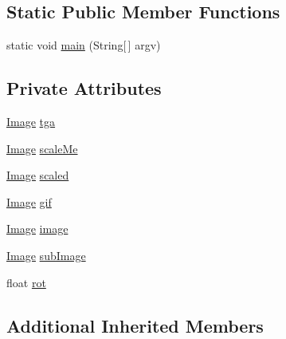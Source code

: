\subsection*{Static Public Member Functions}
\begin{DoxyCompactItemize}
\item 
static void \mbox{\hyperlink{classorg_1_1newdawn_1_1slick_1_1tests_1_1_canvas_container_test_aaadfc68daa8826aaedb71d829018bfdb}{main}} (String\mbox{[}$\,$\mbox{]} argv)
\end{DoxyCompactItemize}
\subsection*{Private Attributes}
\begin{DoxyCompactItemize}
\item 
\mbox{\hyperlink{classorg_1_1newdawn_1_1slick_1_1_image}{Image}} \mbox{\hyperlink{classorg_1_1newdawn_1_1slick_1_1tests_1_1_canvas_container_test_ae2f4c29119e720e355fa9c7f48ded3f8}{tga}}
\item 
\mbox{\hyperlink{classorg_1_1newdawn_1_1slick_1_1_image}{Image}} \mbox{\hyperlink{classorg_1_1newdawn_1_1slick_1_1tests_1_1_canvas_container_test_ad3073ef57cf7775ffde0b46fa9ca451f}{scale\+Me}}
\item 
\mbox{\hyperlink{classorg_1_1newdawn_1_1slick_1_1_image}{Image}} \mbox{\hyperlink{classorg_1_1newdawn_1_1slick_1_1tests_1_1_canvas_container_test_af293aedc5147649973cd9f1235968424}{scaled}}
\item 
\mbox{\hyperlink{classorg_1_1newdawn_1_1slick_1_1_image}{Image}} \mbox{\hyperlink{classorg_1_1newdawn_1_1slick_1_1tests_1_1_canvas_container_test_a71f9f7b72559e875d884ee0464bfafef}{gif}}
\item 
\mbox{\hyperlink{classorg_1_1newdawn_1_1slick_1_1_image}{Image}} \mbox{\hyperlink{classorg_1_1newdawn_1_1slick_1_1tests_1_1_canvas_container_test_ab4b36d2c86487188a6813d9ea094ea78}{image}}
\item 
\mbox{\hyperlink{classorg_1_1newdawn_1_1slick_1_1_image}{Image}} \mbox{\hyperlink{classorg_1_1newdawn_1_1slick_1_1tests_1_1_canvas_container_test_ac5ff4e8d153671ca0a92083077dcb016}{sub\+Image}}
\item 
float \mbox{\hyperlink{classorg_1_1newdawn_1_1slick_1_1tests_1_1_canvas_container_test_a330cd20f94bab9b77c601d707256dc62}{rot}}
\end{DoxyCompactItemize}
\subsection*{Additional Inherited Members}


